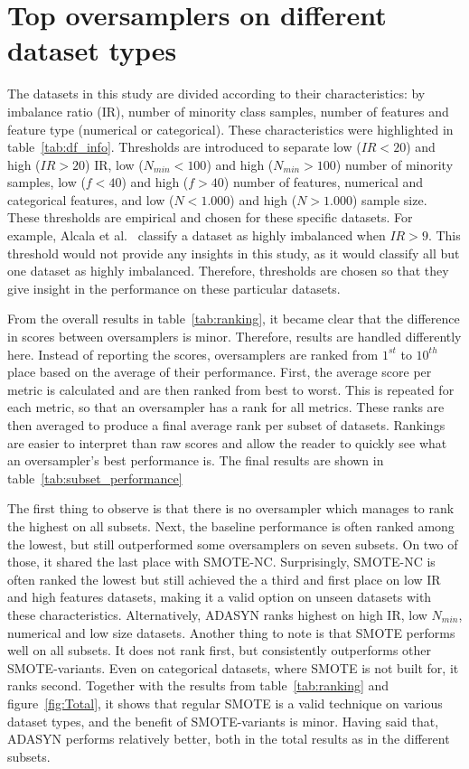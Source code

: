 \section{Top oversamplers on different dataset types}
The datasets in this study are divided according to their characteristics: by imbalance ratio (IR), number of minority class samples, number of features and feature type (numerical or categorical). These characteristics were highlighted in table~\ref{tab:df_info}. Thresholds are introduced to separate low ($IR < 20$) and high ($IR > 20$) IR, low ($N_{min} < 100$) and high ($N_{min} > 100$) number of minority samples, low  ($f < 40$)  and high ($f > 40$) number of features, numerical and categorical features, and low ($N < 1.000$) and high ($N > 1.000$) sample size. These thresholds are empirical and chosen for these specific datasets. For example, Alcala et al.~\cite{Alcala-Fdez2011KEELFramework} classify a dataset as highly imbalanced when $IR > 9$. This threshold would not provide any insights in this study, as it would classify all but one dataset as highly imbalanced. Therefore, thresholds are chosen so that they give insight in the performance on these particular datasets.

From the overall results in table~\ref{tab:ranking}, it became clear that the difference in scores between oversamplers is minor. Therefore, results are handled differently here. Instead of reporting the scores, oversamplers are ranked from $1^{st}$ to $10^{th}$ place based on the average of their performance. First, the average score per metric is calculated and are then ranked from best to worst. This is repeated for each metric, so that an oversampler has a rank for all metrics. These ranks are then averaged to produce a final average rank per subset of datasets. Rankings are easier to interpret than raw scores and allow the reader to quickly see what an oversampler's best performance is. The final results are shown in table~\ref{tab:subset_performance} 

The first thing to observe is that there is no oversampler which manages to rank the highest on all subsets. Next, the baseline performance is often ranked among the lowest, but still outperformed some oversamplers on seven subsets. On two of those, it shared the last place with SMOTE-NC. Surprisingly, SMOTE-NC is often ranked the lowest but still achieved the a third and first place on low IR and high features datasets, making it a valid option on unseen datasets with these characteristics. Alternatively, ADASYN ranks highest on high IR, low $N_{min}$, numerical and low size datasets. Another thing to note is that SMOTE performs well on all subsets. It does not rank first, but consistently outperforms other SMOTE-variants. Even on categorical datasets, where SMOTE is not built for, it ranks second. Together with the results from table~\ref{tab:ranking} and figure~\ref{fig:Total}, it shows that regular SMOTE is a valid technique on various dataset types, and the benefit of SMOTE-variants is minor. Having said that, ADASYN performs relatively better, both in the total results as in the different subsets.

